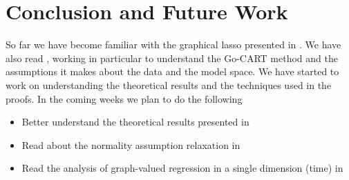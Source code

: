\documentclass[12pt]{article}
\begin{document}



\section{Conclusion and Future Work}

So far we have become familiar with the graphical lasso presented in
\cite{friedman2008}. We have also read \cite{liu2009}, working in
particular to understand the Go-CART method and the assumptions it
makes about the data and the model space. We have started to work on
understanding the theoretical results and the techniques used in the
proofs. In the coming weeks we plan to do the following

\begin{itemize}
\item Better understand the theoretical results presented in \cite{liu2010}
\item Read about the normality assumption relaxation in \cite{liu2009}
\item Read the analysis of graph-valued regression in a single dimension (time) in \cite{zhou2010}
\end{itemize}
\end{document}
